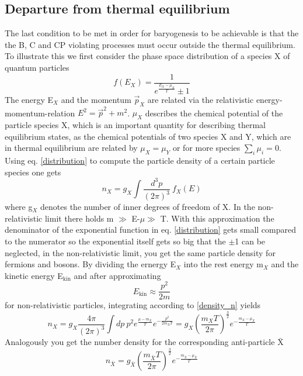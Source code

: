 \subsection{Departure from thermal equilibrium}
The last condition to be met in order for baryogenesis to be achievable is that the the B, C and CP violating processes must occur outside the thermal equilibrium. To illustrate this we first consider the phase space distribution of a species X of quantum particles
\begin{equation}
	f(E_X)=\frac{1}{e^{\frac{E_X-\mu_X}{T}}\pm1}
	\label{distribution}
\end{equation}
The energy E$_X$ and the momentum $\vec{p}_X$ are related via the relativistic energy-momentum-relation $E^2=\vec{p}^2+m^2$. $\mu_X$ describes the chemical potential of the particle species X, which is an important quantity for describing thermal equilibrium states, as the chemical potentials of two species X and Y, which are in thermal equilibrium are related by $\mu_X=\mu_Y$ or for more species $\sum_i\mu_i=0$.\newline
Using eq. \ref{distribution} to compute the particle density of a certain particle species one gets 
\begin{equation}
	n_X=g_X\int\frac{d^3p}{(2\pi)^3}\:f_X(E)
	\label{density_n}
\end{equation}
where g$_X$ denotes the number of inner degrees of freedom of X. \newline
In the non-relativistic limit there holds m $\gg$ E-$\mu\gg$ T. With this approximation the denominator of the exponential function in eq. \ref{distribution} gets small compared to the numerator so the exponential itself gets so big that the $\pm$1 can be neglected, in the non-relativistic limit, you get the same particle density for fermions and bosons. By dividing the ernergy E$_X$ into the rest energy m$_X$ and the kinetic energy E$_{\text{kin}}$ and after approximating
\begin{equation}
	E_{\text{kin}}\approx\frac{p^2}{2m}
\end{equation}
for non-relativistic particles, integrating according to \ref{density_n} yields
\begin{equation}
n_X=g_X\frac{4\pi}{(2\pi)^3}\int dp\:p^2e^\frac{\mu-m_X}{T}e^{-\frac{p^2}{2m_XT}}=g_X\left(\frac{m_XT}{2\pi}\right)^\frac{3}{2}e^{-\frac{m_X-\mu_X}{T}}
\label{numerX}
\end{equation}
Analogously you get the number density for the corresponding anti-particle $\bar{\text{X}}$
\begin{equation}
	n_{\bar{X}}=g_{\bar{X}}\left(\frac{m_{\bar{X}}T}{2\pi}\right)^\frac{3}{2}e^{-\frac{m_{\bar{X}}-\mu_{\bar{X}}}{T}}
\label{numberantiX}
\end{equation}
